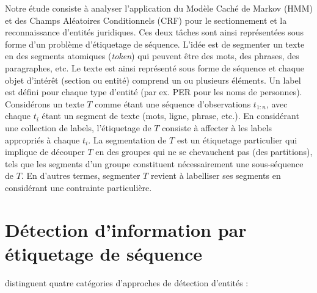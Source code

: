 Notre étude consiste à analyser l'application du Modèle Caché de Markov (HMM) et des Champs Aléatoires Conditionnels (CRF) pour le sectionnement et la reconnaissance d'entités juridiques. Ces deux tâches sont ainsi représentées sous forme d'un problème d'étiquetage de séquence. L'idée est de segmenter un texte en des segments atomiques (\textit{token}) qui peuvent être des mots, des phrases, des paragraphes, etc. Le texte est ainsi représenté sous forme de séquence et chaque objet d'intérêt (section ou entité) comprend  un ou plusieurs éléments. Un label est défini pour chaque type d'entité (par ex. PER pour les noms de personnes). Considérons un texte $T$ comme étant une séquence d'observations $t_{1:n}$, avec chaque $t_i$ étant un segment de texte (mots, ligne, phrase, etc.). En considérant une collection de labels, l'étiquetage de $T$ consiste à affecter à les labels appropriés à chaque $t_i$. La segmentation de $T$ est un étiquetage particulier qui implique de découper $T$ en des groupes qui ne se chevauchent pas (des partitions), tels que les segments d'un groupe constituent nécessairement une sous-séquence de $T$. En d'autres termes, segmenter $T$ revient à labelliser ses segments en considérant une contrainte particulière. 


\section{Détection d'information par étiquetage de séquence}
\label{sec:structuration:biblio}

\citet{chau2002nerwithNN} distinguent quatre catégories d'approches de détection d'entités :

